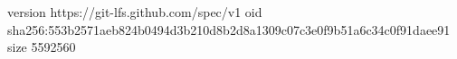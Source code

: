 version https://git-lfs.github.com/spec/v1
oid sha256:553b2571aeb824b0494d3b210d8b2d8a1309c07c3e0f9b51a6c34c0f91daee91
size 5592560
